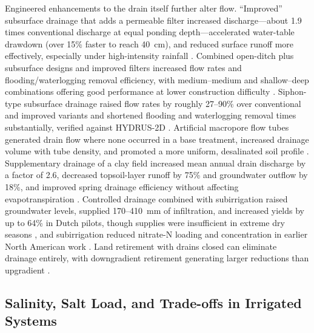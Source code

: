 Engineered enhancements to the drain itself further alter flow. ``Improved''
subsurface drainage that adds a permeable filter increased discharge---about 1.9
times conventional discharge at equal ponding depth---accelerated water-table
drawdown (over 15\% faster to reach 40~cm), and reduced surface runoff more
effectively, especially under high-intensity rainfall
\parencite{Tao2016,Tao2017}. Combined open-ditch plus subsurface designs and
improved filters increased flow rates and flooding/waterlogging removal
efficiency, with medium--medium and shallow--deep combinations offering good
performance at lower construction difficulty \parencite{Ren2021,Tao2025}.
Siphon-type subsurface drainage raised flow rates by roughly 27--90\% over
conventional and improved variants and shortened flooding and waterlogging
removal times substantially, verified against HYDRUS-2D
\parencite{Ren2023}. Artificial macropore flow tubes generated drain flow where
none occurred in a base treatment, increased drainage volume with tube density,
and promoted a more uniform, desalinated soil profile \parencite{Chen2021}.
Supplementary drainage of a clay field increased mean annual drain discharge by
a factor of 2.6, decreased topsoil-layer runoff by 75\% and groundwater outflow
by 18\%, and improved spring drainage efficiency without affecting
evapotranspiration \parencite{Häggblom2019}. Controlled drainage combined with
subirrigation raised groundwater levels, supplied 170--410~mm of infiltration,
and increased yields by up to 64\% in Dutch pilots, though supplies were
insufficient in extreme dry seasons \parencite{deWit2022,deWit2024}, and
subirrigation reduced nitrate-N loading and concentration in earlier North
American work \parencite{FAUSEY1995,Almen2021,Madramootoo2007}. Land retirement
with drains closed can eliminate drainage entirely, with downgradient retirement
generating larger reductions than upgradient \parencite{Purkey2001}.

\subsection{Salinity, Salt Load, and Trade-offs in Irrigated Systems}

